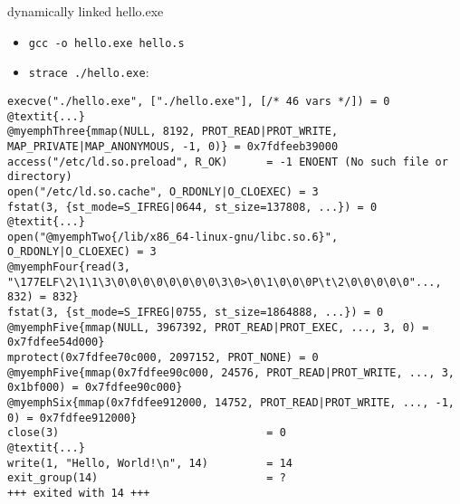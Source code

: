 \begin{frame}[fragile,label=straceDynamic]{dynamically linked hello.exe}
\begin{itemize}
\item \small{\tt gcc -o hello.exe hello.s}
\item \small{\tt strace ./hello.exe}:
\end{itemize}
\begin{Verbatim}[commandchars=@\{\},fontsize=\fontsize{8}{9}\selectfont]
execve("./hello.exe", ["./hello.exe"], [/* 46 vars */]) = 0
@textit{...}
@myemphThree{mmap(NULL, 8192, PROT_READ|PROT_WRITE, MAP_PRIVATE|MAP_ANONYMOUS, -1, 0)} = 0x7fdfeeb39000
access("/etc/ld.so.preload", R_OK)      = -1 ENOENT (No such file or directory)
open("/etc/ld.so.cache", O_RDONLY|O_CLOEXEC) = 3
fstat(3, {st_mode=S_IFREG|0644, st_size=137808, ...}) = 0
@textit{...}
open("@myemphTwo{/lib/x86_64-linux-gnu/libc.so.6}", O_RDONLY|O_CLOEXEC) = 3
@myemphFour{read(3, "\177ELF\2\1\1\3\0\0\0\0\0\0\0\0\3\0>\0\1\0\0\0P\t\2\0\0\0\0\0"..., 832) = 832}
fstat(3, {st_mode=S_IFREG|0755, st_size=1864888, ...}) = 0
@myemphFive{mmap(NULL, 3967392, PROT_READ|PROT_EXEC, ..., 3, 0) = 0x7fdfee54d000}
mprotect(0x7fdfee70c000, 2097152, PROT_NONE) = 0
@myemphFive{mmap(0x7fdfee90c000, 24576, PROT_READ|PROT_WRITE, ..., 3, 0x1bf000) = 0x7fdfee90c000}
@myemphSix{mmap(0x7fdfee912000, 14752, PROT_READ|PROT_WRITE, ..., -1, 0) = 0x7fdfee912000}
close(3)                                = 0
@textit{...}
write(1, "Hello, World!\n", 14)         = 14
exit_group(14)                          = ?
+++ exited with 14 +++
\end{Verbatim}
\end{frame}

